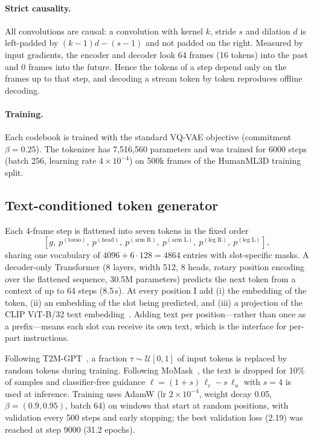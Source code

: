 \documentclass[11pt]{article}
\newcommand{\gtok}{g}
\newcommand{\ptok}{p}
\begin{document}
\paragraph{Strict causality.}
All convolutions are causal: a convolution with kernel $k$, stride $s$ and dilation $d$ is left-padded by
$(k-1)d-(s-1)$ and not padded on the right.
Measured by input gradients, the encoder and decoder look 64 frames (16 tokens) into the past and 0 frames
into the future.
Hence the tokens of a step depend only on the frames up to that step, and decoding a stream token by
token reproduces offline decoding.

\paragraph{Training.}
Each codebook is trained with the standard VQ-VAE objective (commitment $\beta=0.25$).
The tokenizer has 7,516,560 parameters and was trained for 6000 steps (batch 256, learning rate
$4\times10^{-4}$) on 500k frames of the HumanML3D training split.

\subsection{Text-conditioned token generator}
Each 4-frame step is flattened into seven tokens in the fixed order
\begin{equation*}
\left[\gtok,\ \ptok^{(\text{torso})},\ \ptok^{(\text{head})},\ \ptok^{(\text{arm R})},\ \ptok^{(\text{arm L})},\
\ptok^{(\text{leg R})},\ \ptok^{(\text{leg L})}\right],
\end{equation*}
sharing one vocabulary of $4096+6\cdot128=4864$ entries with slot-specific masks.
A decoder-only Transformer (8 layers, width 512, 8 heads, rotary position encoding over the flattened
sequence, 30.5M parameters) predicts the next token from a context of up to 64 steps (8.5\,s).
At every position I add (i) the embedding of the token, (ii) an embedding of the slot being predicted,
and (iii) a projection of the CLIP ViT-B/32 text embedding~\cite{clip}.
Adding text per position---rather than once as a prefix---means each slot can receive its own text,
which is the interface for per-part instructions.

Following T2M-GPT~\cite{t2mgpt}, a fraction $\tau\sim\mathcal{U}[0,1]$ of input tokens is replaced by
random tokens during training.
Following MoMask~\cite{momask}, the text is dropped for 10\% of samples and classifier-free guidance
$\ell=(1+s)\,\ell_c-s\,\ell_u$ with $s=4$ is used at inference.
Training uses AdamW (lr $2\times10^{-4}$, weight decay 0.05, $\beta=(0.9,0.95)$, batch 64) on windows that
start at random positions, with validation every 500 steps and early stopping;
the best validation loss (2.19) was reached at step 9000 (31.2 epochs).
\end{document}
